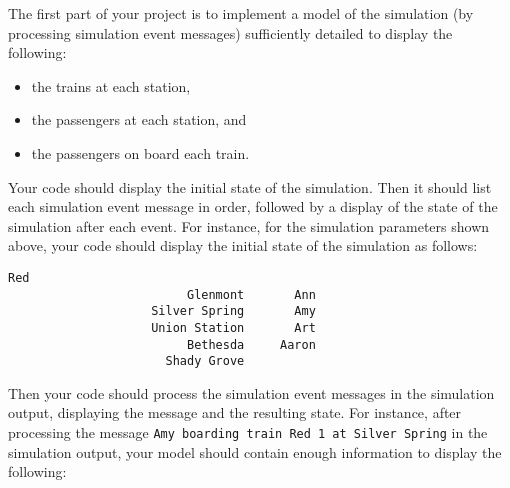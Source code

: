 \documentclass[11pt]{article}
\begin{document}
      The first part of your project is to implement a model of the simulation
    (by processing simulation event messages) sufficiently detailed to
    display the following:

      \enlargethispage{3mm}

      \vspace{-2.5mm}

      \begin{itemize}

        \addtolength{\itemsep}{-2mm}

        \item the trains at each station,

        \item the passengers at each station, and

        \item the passengers on board each train.

      \end{itemize}

      \vspace{-2.5mm}

      Your code should display the initial state of the simulation.  Then it
    should list each simulation event message in order, followed by a
    display of the state of the simulation after each event.  For instance,
    for the simulation parameters shown above, your code should display the
    initial state of the simulation as follows:

      \vspace{-2mm}

      \begin{Verbatim}[gobble=6,xleftmargin=40mm]
      Red
                         Glenmont       Ann
                    Silver Spring       Amy
                    Union Station       Art
                         Bethesda     Aaron
                      Shady Grove
      \end{Verbatim}

      \vspace{-2mm}

      Then your code should process the simulation event messages in the
    simulation output, displaying the message and the resulting state.  For
    instance, after processing the message \texttt{Amy boarding train Red 1
    at Silver Spring} in the simulation output, your model should contain
    enough information to display the following:

      \vspace{-4mm}
\end{document}
